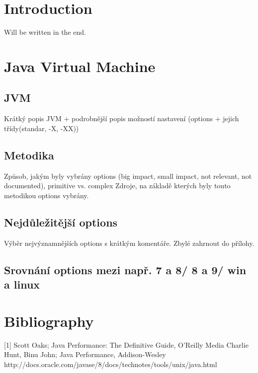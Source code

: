 \documentclass[
  digital, %
  table,   %
  lof,     %
  lot     %
]{fithesis3}
\begin{document}
\chapter{Introduction}
    Will be written in the end.



\chapter{Java Virtual Machine}

\section{JVM}
Krátký popis JVM + podrobnější popis možností nastavení (options + jejich třídy(standar, -X, -XX))

\section{Metodika}
Způsob, jakým byly vybrány options (big impact, small impact, not relevant, not documented), primitive vs. complex \newline
Zdroje, na základě kterých byly touto metodikou options vybrány.

\section{Nejdůležitější options}
Výběr nejvýznamnějších options s krátkým komentáře. Zbylé zahrnout do přílohy.

\section{Srovnání options mezi např. 7 a 8/ 8 a 9/ win a linux}









\chapter{Bibliography}

[1] Scott Oaks; Java Performance: The Definitive Guide, O'Reilly Media \newline
[2] Charlie Hunt, Binu John; Java Performance, Addison-Wesley \newline
[3] http://docs.oracle.com/javase/8/docs/technotes/tools/unix/java.html
\end{document}
